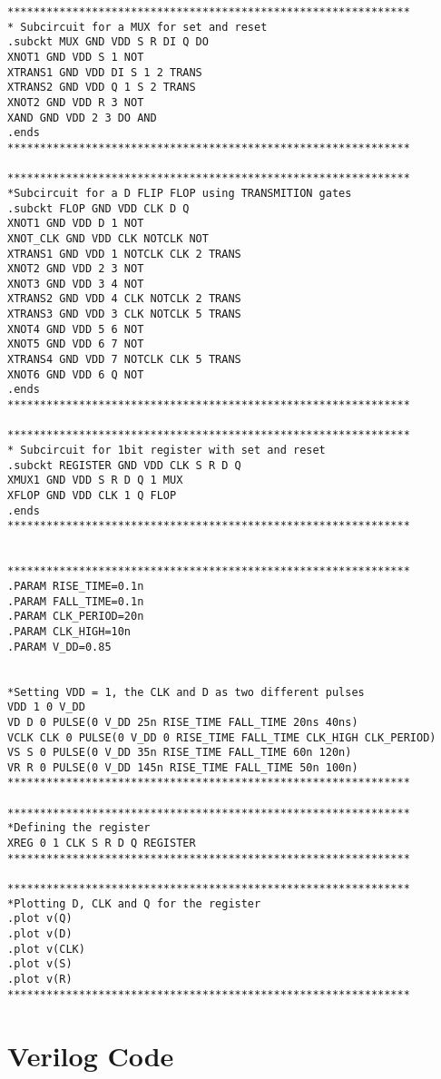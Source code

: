 \begin{lstlisting}[style=aimspiceStyle, caption=1-bit register in AIMSPICE, label=testcode]
**************************************************************
* Subcircuit for a MUX for set and reset
.subckt MUX GND VDD S R DI Q DO
XNOT1 GND VDD S 1 NOT
XTRANS1 GND VDD DI S 1 2 TRANS
XTRANS2 GND VDD Q 1 S 2 TRANS
XNOT2 GND VDD R 3 NOT
XAND GND VDD 2 3 DO AND
.ends 
**************************************************************

**************************************************************
*Subcircuit for a D FLIP FLOP using TRANSMITION gates 
.subckt FLOP GND VDD CLK D Q 
XNOT1 GND VDD D 1 NOT
XNOT_CLK GND VDD CLK NOTCLK NOT
XTRANS1 GND VDD 1 NOTCLK CLK 2 TRANS
XNOT2 GND VDD 2 3 NOT
XNOT3 GND VDD 3 4 NOT 
XTRANS2 GND VDD 4 CLK NOTCLK 2 TRANS
XTRANS3 GND VDD 3 CLK NOTCLK 5 TRANS
XNOT4 GND VDD 5 6 NOT
XNOT5 GND VDD 6 7 NOT
XTRANS4 GND VDD 7 NOTCLK CLK 5 TRANS
XNOT6 GND VDD 6 Q NOT
.ends
**************************************************************

**************************************************************
* Subcircuit for 1bit register with set and reset
.subckt REGISTER GND VDD CLK S R D Q 
XMUX1 GND VDD S R D Q 1 MUX
XFLOP GND VDD CLK 1 Q FLOP
.ends
**************************************************************


**************************************************************
.PARAM RISE_TIME=0.1n 
.PARAM FALL_TIME=0.1n 
.PARAM CLK_PERIOD=20n 
.PARAM CLK_HIGH=10n 
.PARAM V_DD=0.85


*Setting VDD = 1, the CLK and D as two different pulses
VDD 1 0 V_DD
VD D 0 PULSE(0 V_DD 25n RISE_TIME FALL_TIME 20ns 40ns)
VCLK CLK 0 PULSE(0 V_DD 0 RISE_TIME FALL_TIME CLK_HIGH CLK_PERIOD)
VS S 0 PULSE(0 V_DD 35n RISE_TIME FALL_TIME 60n 120n)
VR R 0 PULSE(0 V_DD 145n RISE_TIME FALL_TIME 50n 100n)
**************************************************************

**************************************************************
*Defining the register
XREG 0 1 CLK S R D Q REGISTER
**************************************************************

**************************************************************
*Plotting D, CLK and Q for the register
.plot v(Q)
.plot v(D)
.plot v(CLK)
.plot v(S) 
.plot v(R)
**************************************************************

\end{lstlisting}


\section{Verilog Code}

